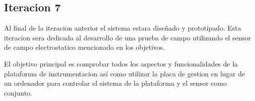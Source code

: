 \subsection{Iteracion 7} %
\label{sub:iteracion_7}

Al final de la iteracion anterior el sistema estara diseñado y prototipado. Esta iteracion sera dedicada al desarrollo de una prueba de campo utilizando el sensor de campo electrostatico mencionado en los objetivos. 

El objetivo principal es comprobar todos los aspectos y funcionalidades de la plataforma de instrumentacion así como utilizar la placa de gestion en lugar de un ordenador para controlar el sistema de la plataforma y el sensor como conjunto.











